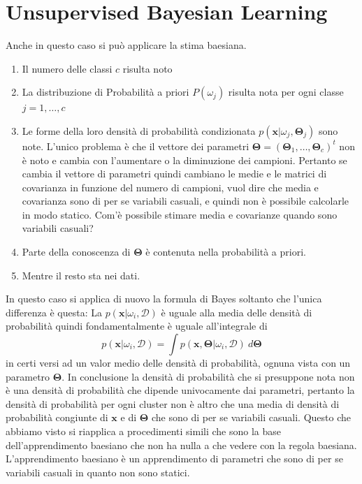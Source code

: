 \section{Unsupervised Bayesian Learning}
Anche in questo caso si può applicare la stima baesiana. 
\begin{enumerate}
\item Il numero delle classi $c$ risulta noto
\item La distribuzione di Probabilità a priori $P(\omega_j)$ risulta nota per ogni classe $j=1, \dots, c$
\item Le forme della loro densità di probabilità condizionata $p(\mathbf{x}|\omega_j, \mathbf{\Theta}_j)$ sono note. L'unico problema è che il vettore dei parametri $\mathbf{\Theta} = (\mathbf{\Theta}_1, \dots, \mathbf{\Theta}_c)^t$ non è noto e cambia con l'aumentare o la diminuzione dei campioni. Pertanto se cambia il vettore di parametri quindi cambiano le medie e le matrici di covarianza in funzione del numero di campioni, vuol dire che media e covarianza sono di per se variabili casuali, e quindi non è possibile calcolarle in modo statico. Com'è possibile stimare media e covarianze quando sono variabili casuali?  
\item Parte della conoscenza di $\mathbf{\Theta}$ è contenuta nella probabilità a priori.
\item Mentre il resto sta nei dati.
\end{enumerate}
In questo caso si applica di nuovo la formula di Bayes soltanto che l'unica differenza è questa: 
La $p(\mathbf{x} | \omega_i, \mathcal{D})$ è uguale alla media delle densità di probabilità quindi fondamentalmente è uguale all'integrale di
\begin{equation}
p(\mathbf{x} | \omega_i, \mathcal{D}) = \int p(\mathbf{x}, \mathbf{\Theta} | \omega_i, \mathcal{D}) \ d \mathbf{\Theta}
\end{equation}
in certi versi ad un valor medio delle densità di probabilità, ognuna vista con un parametro $\mathbf{\Theta}$.  In conclusione la densità di probabilità che si presuppone nota non è una densità di probabilità che dipende univocamente dai parametri, pertanto la densità di probabilità per ogni cluster non è altro che una media di densità di probabilità congiunte di $\mathbf{x}$ e di $\mathbf{\Theta}$ che sono di per se variabili casuali. Questo che abbiamo visto si riapplica a procedimenti simili che sono la base dell'apprendimento baesiano che non ha nulla a che vedere con la regola baesiana. L'apprendimento baesiano è un apprendimento di parametri che sono di per se variabili casuali in quanto non sono statici. 


